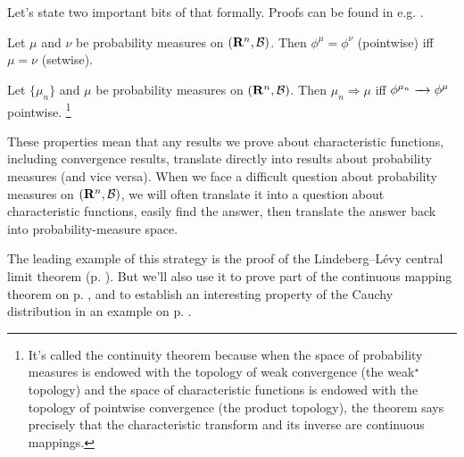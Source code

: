 \documentclass[11pt,letterpaper,reqno,oneside]{article}
\begin{document}
Let's state two important bits of that formally. Proofs can be found in e.g. \textcite[][ch. 10]{Rosenthal2006}.
%
\begin{theorem}
	Let $\mu$ and $\nu$ be probability measures on $\left(\mathbf{R}^n,\mathcal{B}\right)$. Then $\phi^\mu=\phi^\nu$ (pointwise) iff $\mu=\nu$ (setwise).	
\end{theorem}
%
\begin{theorem}
	\label{theorem:Levys_continuity_theorem}
	Let $\{ \mu_n \}$ and $\mu$ be probability measures on $\left(\mathbf{R}^n,\mathcal{B}\right)$. Then $\mu_n \Rightarrow \mu$ iff $\phi^{\mu_n} \xrightarrow{\;\;\;} \phi^\mu$ pointwise.%
		\footnote{It's called the continuity theorem because when the space of probability measures is endowed with the topology of weak convergence (the weak$^\star$ topology) and the space of characteristic functions is endowed with the topology of pointwise convergence (the product topology), the theorem says precisely that the characteristic transform and its inverse are continuous mappings.}	
\end{theorem}


These properties mean that any results we prove about characteristic functions, including convergence results, translate directly into results about probability measures (and vice versa). When we face a difficult question about probability measures on $\left(\mathbf{R}^n,\mathcal{B}\right)$, we will often translate it into a question about characteristic functions, easily find the answer, then translate the answer back into probability-measure space.

The leading example of this strategy is the proof of the Lindeberg--Lévy central limit theorem (p. \pageref{theorem:Lindeberg-Levy}). But we'll also use it to prove part of the continuous mapping theorem on p. \pageref{proof:CMT_3}, and to establish an interesting property of the Cauchy distribution in an example on p. \pageref{example:Cauchy_LLN}.
\end{document}
